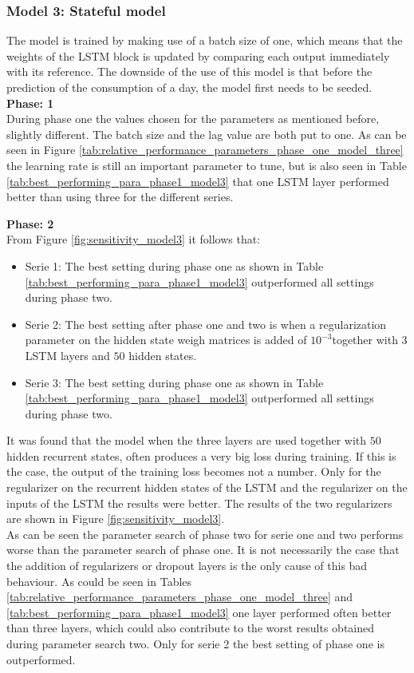 \newpage
\subsubsection{Model 3: Stateful model}
The model is trained by making use of a batch size of one, which means that the weights of the LSTM block is updated by comparing each output immediately with its reference. The downside of the use of this model is that before the prediction of the consumption of a day, the model first needs to be seeded.\\

\textbf{Phase: 1}\\
During phase one the values chosen for the parameters as mentioned before, slightly different. The batch size and the lag value are both put to one. As can be seen in Figure \ref{tab:relative_performance_parameters_phase_one_model_three} the learning rate is still an important parameter to tune, but is also seen in Table \ref{tab:best_performing_para_phase1_model3} that one LSTM layer performed better than using three for the different series. 

\textbf{Phase: 2}\\
From Figure \ref{fig:sensitivity_model3} it follows that:
\begin{itemize}
	\item Serie 1: The best setting during phase one as shown in Table \ref{tab:best_performing_para_phase1_model3} outperformed all settings during phase two. 
	\item Serie 2: The best setting after phase one and two is when a regularization parameter on the hidden state weigh matrices is added of $ 10^{-3} $together with $ 3 $ LSTM layers and $ 50 $ hidden states.
	\item Serie 3: The best setting during phase one as shown in Table \ref{tab:best_performing_para_phase1_model3} outperformed all settings during phase two. 
\end{itemize}

It was found that the model when the three layers are used together with $ 50 $ hidden recurrent states, often produces a very big loss during training. If this is the case, the output of the training loss becomes not a number. Only for the regularizer on the recurrent hidden states of the LSTM and the regularizer on the inputs of the LSTM the results were better. The results of the two regularizers are shown in Figure \ref{fig:sensitivity_model3}.\\

As can be seen the parameter search of phase two for serie one and two performs worse than the parameter search of phase one. It is not necessarily the case that the addition of regularizers or dropout layers is the only cause of this bad behaviour. As could be seen in Tables \ref{tab:relative_performance_parameters_phase_one_model_three} and \ref{tab:best_performing_para_phase1_model3} one layer performed often better than three layers, which could also contribute to the worst results obtained during parameter search two. Only for serie 2 the best setting of phase one is outperformed. \\

